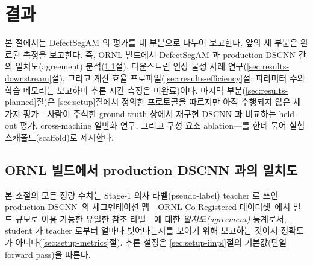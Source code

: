 \section{결과}
\label{sec:results}

본 절에서는 DefectSegAM 의 평가를 네 부분으로 나누어 보고한다. 앞의 세
부분은 완료된 측정을 보고한다. 즉, ORNL 빌드에서 DefectSegAM 과
production DSCNN 간의 일치도(agreement)
분석(\ref{sec:results-agreement}절), 다운스트림 인장 물성 사례
연구(\ref{sec:results-downstream}절), 그리고 계산 효율
프로파일(\ref{sec:results-efficiency}절; 파라미터 수와 학습 메모리는
보고하며 추론 시간 측정은 미완료)이다. 마지막
부분(\ref{sec:results-planned}절)은 \ref{sec:setup}절에서 정의한
프로토콜을 따르지만 아직 수행되지 않은 세 가지 평가---사람이 주석한
ground truth 상에서 재구현 DSCNN 과 비교하는 held-out 평가, cross-machine
일반화 연구, 그리고 구성 요소 ablation---를 한데 묶어 실험
스캐폴드(scaffold)로 제시한다.

\subsection{ORNL 빌드에서 production DSCNN 과의 일치도}
\label{sec:results-agreement}

본 소절의 모든 정량 수치는 Stage-1 의사 라벨(pseudo-label) teacher 로
쓰인 production DSCNN~\cite{Scime2020DSCNN}의 세그멘테이션 맵---ORNL
Co-Registered 데이터셋~\cite{ORNL_CoRegistered_Dataset}에서 빌드 규모로
이용 가능한 유일한 참조 라벨---에 대한 \emph{일치도(agreement)} 통계로서,
student 가 teacher 로부터 얼마나 벗어나는지를 보이기 위해 보고하는
것이지 정확도가 아니다(\ref{sec:setup-metrics}절). 추론 설정은
\ref{sec:setup-impl}절의 기본값(단일 forward pass)을 따른다.

